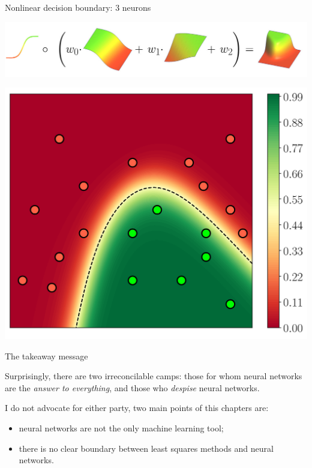\documentclass[UKenglish,aspectratio=169]{beamer}
\begin{document}
\begin{frame}{Nonlinear decision boundary: 3 neurons}
\centerline{\includegraphics[width=.9\linewidth]{../manuscript/img/3n.jpg}}
\pause
\centerline{\includegraphics[width=.38\linewidth]{../manuscript/img/neural.png}}
\end{frame}

\begin{frame}{The takeaway message}
\vspace{2ex}

Surprisingly, there are two irreconcilable camps: those for whom neural networks are the \textit{answer to everything}, and those who \textit{despise} neural networks.


\vspace{2ex}
I do not advocate for either party, two main points of this chapters are:

\vspace{2ex}
\begin{itemize}
\item neural networks are not the only machine learning tool;
\item there is no clear boundary between least squares methods and neural networks.
\end{itemize}
\end{frame}
\end{document}
